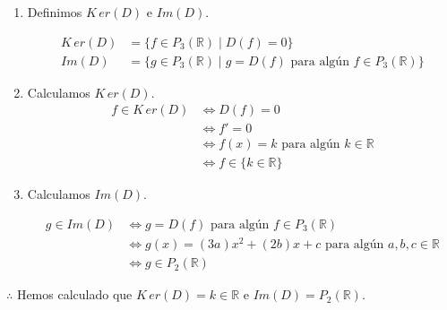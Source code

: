 \begin{enumerate}
    \item Definimos $K\,er(D)$ e $Im(D)$.
    
    \begin{align*}
        K\,er(D) & = \{ f \in P_{3}(\mathbb{R}) \mid D(f) = 0 \} \\
        Im(D)    & = \{ g \in P_{3}(\mathbb{R}) \mid g = D(f) \text{ para algún } f \in P_{3}(\mathbb{R}) \}
    \end{align*}

    \item Calculamos $K\,er(D)$.
    \begin{align*}
        f \in K\,er(D) &\Longleftrightarrow D(f) = 0 \\
        &\Longleftrightarrow f' = 0 \\
        &\Longleftrightarrow f(x) = k \text{ para algún } k \in \mathbb{R} \\
        &\Longleftrightarrow f \in \{ k \in \mathbb{R} \}
    \end{align*}
        
    \item Calculamos $Im(D)$.
    
    \begin{align*}
        g \in Im(D) &\Longleftrightarrow g = D(f) \text{ para algún } f \in P_{3}(\mathbb{R}) \\
        &\Longleftrightarrow g(x) = (3a)x^2 + (2b)x + c \text{ para algún } a, b, c \in \mathbb{R} \\
        &\Longleftrightarrow g \in P_{2}(\mathbb{R})
    \end{align*}        
\end{enumerate}

$\therefore$ Hemos calculado que $K\,er(D) = { k \in \mathbb{R} }$ e $Im(D) = P_{2}(\mathbb{R})$.
